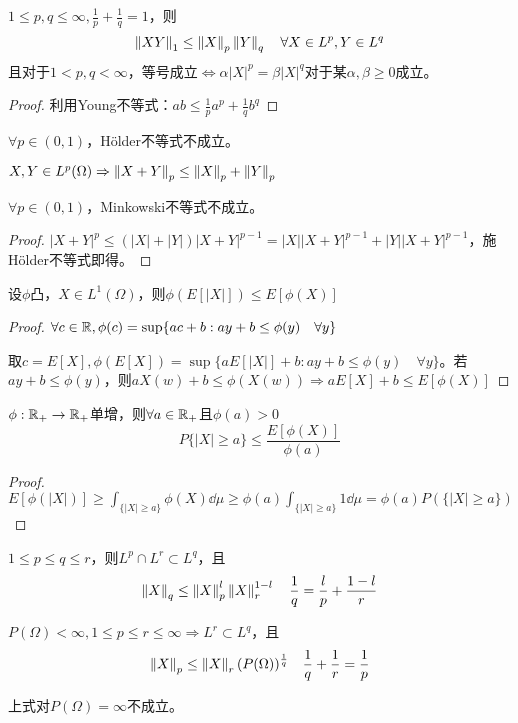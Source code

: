 \documentclass{ctexart}
\begin{document}
\begin{Thm}[H\"older]
  $1\leq p,q\leq \infty,\frac{1}{p}+\frac{1}{q}=1$，则
  \[\left\|XY\right\|_{1}\leq \left\|X\right\|_{p}\left\|Y\right\|_{q}\quad \forall X\in L^{p}, Y\in L^{q}\]
  且对于$1<p,q<\infty$，等号成立$\Leftrightarrow \alpha |X|^{p}=\beta|X|^{q}$对于某$\alpha,\beta\geq 0$成立。
\end{Thm}

\begin{proof}
  利用Young不等式：$ab\leq \frac{1}{p}a^{p}+\frac{1}{q}b^{q}$
\end{proof}

\begin{Rmk}
  $\forall p\in(0,1)$，H\"older不等式不成立。
\end{Rmk}

\begin{Thm}[Minkowski]
  $X,Y\in L^{p}(\Omega)\Rightarrow \left\|X+Y\right\|_{p}\leq \left\|X\right\|_{p}+\left\|Y\right\|_{p}$
\end{Thm}

\begin{Rmk}
  $\forall p\in(0,1)$，Minkowski不等式不成立。
\end{Rmk}

\begin{proof}
  $|X+Y|^{p}\leq (|X|+|Y|)|X+Y|^{p-1}=|X||X+Y|^{p-1}+|Y||X+Y|^{p-1}$，施H\"older不等式即得。
\end{proof}

\begin{Thm}[Jensen]
  设$\phi$凸，$X\in L^{1}(\Omega)$，则$\phi(E[|X|])\leq E[\phi(X)]$
\end{Thm}

\begin{proof}
  $\forall c\in\mathbb{R},\phi(c)=\sup\{ac+b:ay+b\leq \phi(y)\quad\forall y\}$

  取$c=E[X],\phi(E[X])=\sup\{aE[|X|]+b:ay+b\leq \phi(y)\quad\forall y\}$。若$ay+b\leq\phi(y)$，则$aX(w)+b\leq \phi(X(w))\Rightarrow aE[X]+b\leq E[\phi(X)]$
\end{proof}

\begin{Thm}[Chebyshev]
  $\phi:\mathbb{R}_{+}\to\mathbb{R}_{+}$单增，则$\forall a\in\mathbb{R}_{+}$且$\phi(a)>0$
  \[P\{|X|\geq a\}\leq \frac{E[\phi(X)]}{\phi(a)}\]
\end{Thm}
\begin{proof}
  $E[\phi(|X|)]\geq \int_{\{|X|\geq a\}}\phi(X)\dd\mu\geq \phi(a)\int_{\{|X|\geq a\}}1\dd\mu=\phi(a)P(\{|X|\geq a\})$
\end{proof}

\begin{Eg}[Interpolation]
  $1\leq p\leq q\leq r$，则$L^{p}\cap L^{r}\subset L^{q}$，且
  \[\left\|X\right\|_{q}\leq \left\|X\right\|_{p}^{l}\left\|X\right\|_{r}^{1-l}\quad \frac{1}{q}=\frac{l}{p}+\frac{1-l}{r}\]
\end{Eg}

\begin{Eg}
  $P(\Omega)<\infty, 1\leq p\leq r\leq \infty\Rightarrow L^{r}\subset L^{q}$，且
  \[\left\|X\right\|_{p}\leq \left\|X\right\|_{r}(P(\Omega))^{\frac{1}{q}}\quad \frac{1}{q}+\frac{1}{r}=\frac{1}{p}\]
\end{Eg}

\begin{Rmk}
  上式对$P(\Omega)=\infty$不成立。
\end{Rmk}

\ifx\allfiles\undefined
\end{document}

